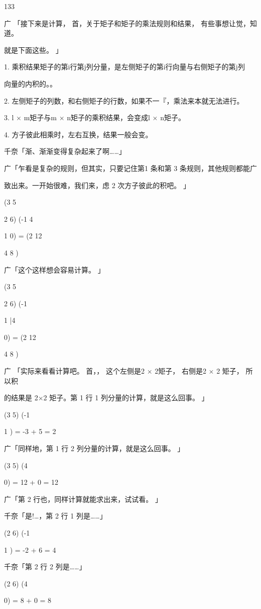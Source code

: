 133\par
广 「接下来是计算， 首，关于矩子和矩子的乘法规则和结果， 有些事想让觉，知道。\par
就是下面这些。 」\par
1. 乘积结果矩子的第i行第j列分量，是左侧矩子的第i行向量与右侧矩子的第j列\par
向量的内积的。。\par
2. 左侧矩子的列数，和右侧矩子的行数，如果不一『，乘法来本就无法进行。\par
3. l $\times$ m矩子与m $\times$ n矩子的乘积结果，会变成l $\times$ n矩子。\par
4. 方子彼此相乘时，左右互换，结果一般会变。\par
千奈「渐、渐渐变得复杂起来了啊……」\par
广「乍看是复杂的规则，但其实，只要记住第1 条和第 3 条规则，其他规则都能广\par
致出来。一开始很难，我们来，虑 2 次方子彼此的积吧。 」\par
(3 5\par
2 6) (-1 4\par
1 0) = (2 12\par
4 8 )\par
广「这个这样想会容易计算。 」\par
(3 5\par
2 6) (-1\par
1 |4\par
0) = (2 12\par
4 8 )\par
广 「实际来看看计算吧。 首，， 这个左侧是2 $\times$ 2矩子， 右侧是2 $\times$ 2 矩子， 所以积\par
的结果是 2$\times$2 矩子。第 1 行 1 列分量的计算，就是这么回事。 」\par
(3 5) (-1\par
1 ) = -3 + 5 = 2\par
广「同样地，第 1 行 2 列分量的计算，就是这么回事。 」\par
(3 5) (4\par
0) = 12 + 0 = 12\par
广「第 2 行也，同样计算就能求出来，试试看。 」\par
千奈「是!…，第 2 行 1 列是……」\par
(2 6) (-1\par
1 ) = -2 + 6 = 4\par
千奈「第 2 行 2 列是……」\par
(2 6) (4\par
0) = 8 + 0 = 8\par

